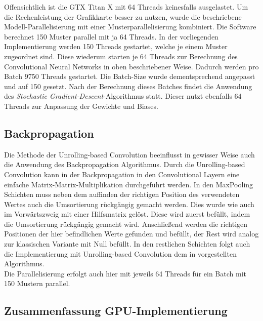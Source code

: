 \documentclass[../main.tex]{subfiles}
\begin{document}
Offensichtlich ist die GTX Titan X mit 64 Threads keinesfalls ausgelastet. Um die Rechenleistung der Grafikkarte besser zu nutzen, wurde die beschriebene Modell-Parallelisierung mit einer Musterparallelisierung kombiniert. Die Software berechnet 150 Muster parallel mit ja 64 Threads. In der vorliegenden Implementierung werden 150 Threads gestartet, welche je einem Muster zugeordnet sind. Diese wiederum starten je 64 Threads zur Berechnung des Convolutional Neural Networks in oben beschriebener Weise. Dadurch werden pro Batch 9750 Threads gestartet. Die Batch-Size wurde dementsprechend angepasst und auf 150 gesetzt. Nach der Berechnung dieses Batches findet die Anwendung des \emph{Stochastic Gradient-Descent}-Algorithmus statt. Dieser nutzt ebenfalls 64 Threads zur Anpassung der Gewichte und Biases. \par 

\subsection{Backpropagation} \label{sec:cuda_back}
Die Methode der Unrolling-based Convolution beeinflusst in gewisser Weise auch die Anwendung des Backpropagation Algorithmus. Durch die Unrolling-based Convolution kann in der Backpropagation in den Convolutional Layern eine einfache Matrix-Matrix-Multiplikation durchgeführt werden. In den MaxPooling Schichten muss neben dem auffinden der richtigen Position des verwendeten Wertes auch die Umsortierung rückgängig gemacht werden. Dies wurde wie auch im Vorwärtszweig mit einer Hilfsmatrix gelöst. Diese wird zuerst befüllt, indem die Umsortierung rückgängig gemacht wird. Anschließend werden die richtigen Positionen der hier befindlichen Werte gefunden und befüllt, der Rest wird analog zur klassischen Variante mit Null befüllt. In den restlichen Schichten folgt auch die Implementierung mit Unrolling-based Convolution dem in  vorgestellten Algorithmus. \\ Die Parallelisierung erfolgt auch hier mit jeweils 64 Threads für ein Batch mit 150 Mustern parallel. 

\subsection{Zusammenfassung GPU-Implementierung} \label{sec:cuda_zusammenfassung}
\end{document}
